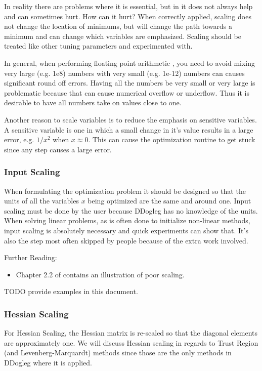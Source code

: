 \documentclass[peerreview,compsoc,onecolumn]{IEEEtran}
\begin{document}
In reality there are problems where it is essential, but in it does not always help and can sometimes hurt. How can it hurt? When correctly applied, scaling does not change the location of minimums, but will change the path towards a minimum \cite{dennis1996} and can change which variables are emphasized. Scaling should be treated like other tuning parameters and experimented with.

In general, when performing floating point arithmetic \cite{goldberg1991every}, you need to avoid mixing very large (e.g. 1e8) numbers with very small (e.g. 1e-12) numbers can causes significant round off errors. Having all the numbers be very small or very large is problematic because that can cause numerical overflow or underflow. Thus it is desirable to have all numbers take on values close to one.

Another reason to scale variables is to reduce the emphasis on sensitive variables. A sensitive variable is one in which a small change in it's value results in a large error, e.g. $1/x^2$ when $x \approx 0$. This can cause the optimization routine to get stuck since any step causes a large error.

\subsubsection{Input Scaling}

When formulating the optimization problem it should be designed so that the units
of all the variables $x$ being optimized are the same and around one. Input scaling must be done by the user because DDogleg has no knowledge of the units. When solving linear problems, as is often done to initialize non-linear methods, input scaling is absolutely necessary and quick experiments can show that. It's also the step most often skipped by people because of the extra work involved.

Further Reading:
\begin{itemize}
\item Chapter 2.2 of \cite{numopt2006} contains an illustration of poor scaling.
\end{itemize}

TODO provide examples in this document.

\subsubsection{Hessian Scaling}

For Hessian Scaling, the Hessian matrix is re-scaled so that the diagonal elements are approximately one. We will discuss Hessian scaling in regards to Trust Region (and Levenberg-Marquardt) methods since those are the only methods in DDogleg where it is applied.
\end{document}
